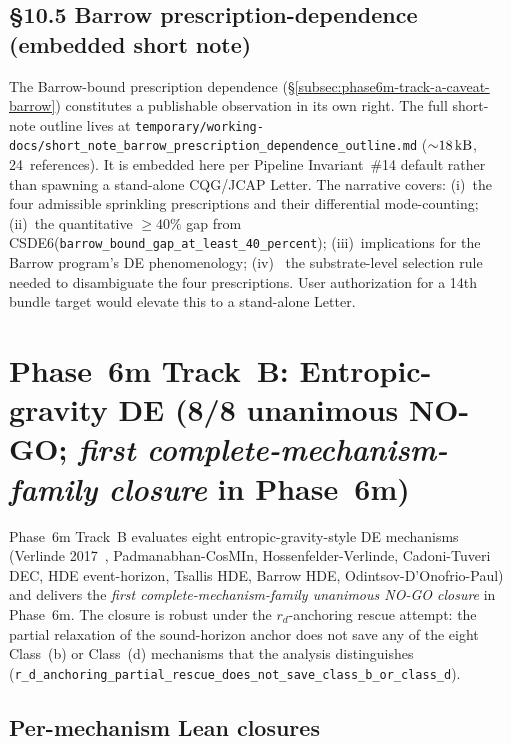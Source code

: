 \documentclass[aps,prd,reprint,nofootinbib,superscriptaddress]{revtex4-2}
\begin{document}
\subsection*{§10.5 Barrow prescription-dependence (embedded short note)}
\label{subsec:barrow-short-note}

The Barrow-bound prescription dependence (§\ref{subsec:phase6m-track-a-caveat-barrow})
constitutes a publishable observation in its own right. The full
short-note outline lives at
\texttt{temporary/working-docs/short\_note\_barrow\_prescription\_dependence\_outline.md}
(${\sim}\SI{18}{\kilo\byte}$, 24~references). It is embedded here per
Pipeline Invariant~\#14 default rather than spawning a stand-alone
CQG/JCAP Letter. The narrative covers: (i)~the four admissible sprinkling
prescriptions and their differential mode-counting; (ii)~the
quantitative $\geq 40\%$ gap from CSDE6\textquotesingle (\texttt{barrow\_bound\_gap\_at\_least\_40\_percent});
(iii)~implications for the Barrow program's DE phenomenology; (iv)~
the substrate-level selection rule needed to disambiguate the four
prescriptions. User authorization for a 14th bundle target would
elevate this to a stand-alone Letter.

\section{Phase~6m Track~B: Entropic-gravity DE (8/8 unanimous NO-GO;
\emph{first complete-mechanism-family closure} in Phase~6m)}
\label{sec:phase6m-track-b}

Phase~6m Track~B evaluates eight entropic-gravity-style DE mechanisms
(Verlinde 2017~\cite{Verlinde2017dSEmergent}, Padmanabhan-CosMIn,
Hossenfelder-Verlinde, Cadoni-Tuveri DEC,
HDE event-horizon, Tsallis HDE, Barrow HDE, Odintsov-D'Onofrio-Paul) and
delivers the \emph{first complete-mechanism-family unanimous NO-GO closure}
in Phase~6m. The closure is robust under the $r_d$-anchoring rescue
attempt: the partial relaxation of the sound-horizon anchor does not
save any of the eight Class~(b) or Class~(d) mechanisms that the analysis
distinguishes
(\texttt{r\_d\_anchoring\_partial\_rescue\_does\_not\_save\_class\_b\_or\_class\_d}).

\subsection{Per-mechanism Lean closures}
\label{subsec:phase6m-track-b-bounds}
\end{document}
